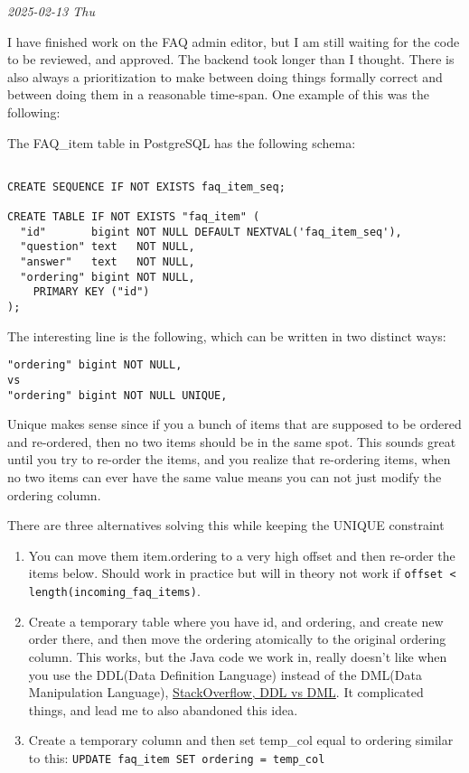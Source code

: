 \documentclass[../main.tex]{subfiles}
\begin{document}
\bigskip
\noindent \textit{2025-02-13 Thu}
\smallskip

 I have finished work on the FAQ admin editor, but I am still waiting for the code to be reviewed, and approved. The backend took longer than I thought. There is also always a prioritization to make between doing things formally correct and between doing them in a reasonable time-span. One example of this was the following:


The FAQ\_item table in PostgreSQL has the following schema:

\begin{verbatim}
    
CREATE SEQUENCE IF NOT EXISTS faq_item_seq;
  
CREATE TABLE IF NOT EXISTS "faq_item" ( 
  "id"       bigint NOT NULL DEFAULT NEXTVAL('faq_item_seq'),
  "question" text   NOT NULL,
  "answer"   text   NOT NULL,
  "ordering" bigint NOT NULL,
    PRIMARY KEY ("id")
);

\end{verbatim}

The interesting line is the following, which can be written in two distinct ways:

\begin{verbatim}
"ordering" bigint NOT NULL,
vs
"ordering" bigint NOT NULL UNIQUE,
\end{verbatim}

Unique makes sense since if you a bunch of items that are supposed to be ordered and re-ordered, then no two items should be in the same spot. This sounds great until you try to re-order the items, and you realize that re-ordering items, when no two items can ever have the same value means you can not just modify the ordering column.

There are three alternatives solving this while keeping the UNIQUE constraint

\begin{enumerate}
\def\labelenumi{\arabic{enumi}.}
\item You can move them item.ordering to a very high offset and then re-order the items below. Should work in practice but will in theory not work if \verb|offset < length(incoming_faq_items)|. 
\item  Create a temporary table where you have id, and ordering, and create new order there, and then move the ordering atomically to the original ordering column. This works, but the Java code we work in, really doesn't like when you use the DDL(Data Definition Language) instead of the DML(Data Manipulation Language), \href{https://stackoverflow.com/questions/2578194/what-are-ddl-and-dml}{StackOverflow, DDL vs DML}. It complicated things, and lead me to also abandoned this idea.
\item Create a temporary column and then set temp\_col equal to ordering similar to this: \verb|UPDATE faq_item SET ordering = temp_col|
\end{enumerate}
\end{document}
